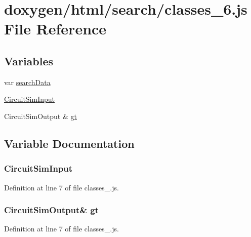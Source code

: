 \hypertarget{a00067}{}\section{doxygen/html/search/classes\+\_\+6.js File Reference}
\label{a00067}
\subsection*{Variables}
\begin{DoxyCompactItemize}
\item 
var \hyperlink{a00067_ad01a7523f103d6242ef9b0451861231e}{search\+Data}
\item 
\hyperlink{a00067_a3b2037e87581e24a76ea975b24cd0def}{Circuit\+Sim\+Input}
\item 
Circuit\+Sim\+Output \& \hyperlink{a00067_ac7868f17f85d4d214dad20ef4d08e7de}{gt}
\end{DoxyCompactItemize}


\subsection{Variable Documentation}
\hypertarget{a00067_a3b2037e87581e24a76ea975b24cd0def}{}
\subsubsection[{Circuit\+Sim\+Input}]{\setlength{\rightskip}{0pt plus 5cm}Circuit\+Sim\+Input}\label{a00067_a3b2037e87581e24a76ea975b24cd0def}


Definition at line 7 of file classes\+\_.\+js.

\hypertarget{a00067_ac7868f17f85d4d214dad20ef4d08e7de}{}
\subsubsection[{gt}]{\setlength{\rightskip}{0pt plus 5cm}Circuit\+Sim\+Output\& gt}\label{a00067_ac7868f17f85d4d214dad20ef4d08e7de}


Definition at line 7 of file classes\+\_.\+js.

\hypertarget{a00067_ad01a7523f103d6242ef9b0451861231e}{}
